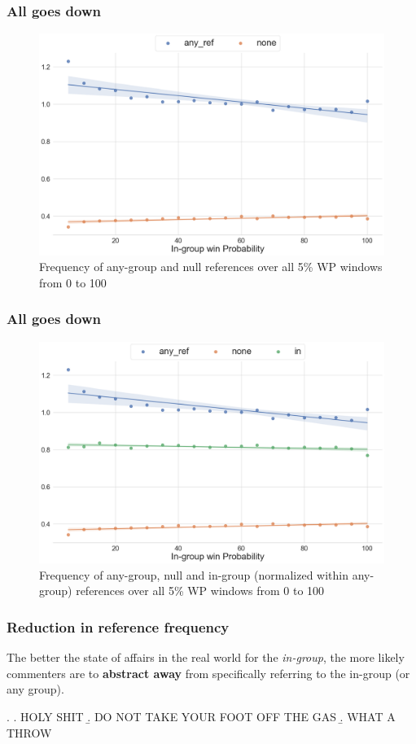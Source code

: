 \begin{frame}[c]\frametitle{All goes down}
    \pause
    \begin{figure}[t]
        \centering
        \includegraphics[width=0.85\linewidth]{figures/trends-1.png}
        \caption{Frequency of any-group and null references over all 5\% WP windows from 0 to 100}
        \label{fig:trends-1}
    \end{figure}
\end{frame}

\begin{frame}[c]\frametitle{All goes down}
    \begin{figure}[t]
        \centering
        \includegraphics[width=0.85\linewidth]{figures/trends-2.png}
        \caption{Frequency of any-group, null and in-group (normalized within any-group) references over all 5\% WP windows from 0 to 100}
        \label{fig:trends-2}
    \end{figure}
\end{frame}

\begin{frame}[c]\frametitle{Reduction in reference frequency}
    The better the state of affairs in the real world for the \emph{in-group}, the more likely commenters are to \textbf{abstract away} from specifically referring to the in-group (or any group). \pause
    
    \ex.\label{ex:high-wp} \a. HOLY SHIT 
         \b. DO NOT TAKE YOUR FOOT OFF THE GAS
         \b. WHAT A THROW

\end{frame}


